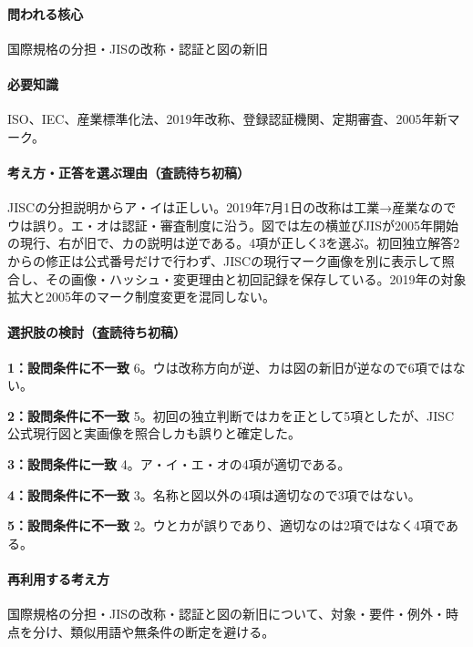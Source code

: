 \paragraph{問われる核心} 国際規格の分担・JISの改称・認証と図の新旧

\paragraph{必要知識} ISO、IEC、産業標準化法、2019年改称、登録認証機関、定期審査、2005年新マーク。

\paragraph{考え方・正答を選ぶ理由（査読待ち初稿）} JISCの分担説明からア・イは正しい。2019年7月1日の改称は工業→産業なのでウは誤り。エ・オは認証・審査制度に沿う。図では左の横並びJISが2005年開始の現行、右が旧で、カの説明は逆である。4項が正しく3を選ぶ。初回独立解答2からの修正は公式番号だけで行わず、JISCの現行マーク画像を別に表示して照合し、その画像・ハッシュ・変更理由と初回記録を保存している。2019年の対象拡大と2005年のマーク制度変更を混同しない。

\paragraph{選択肢の検討（査読待ち初稿）}\mbox{}\par

\noindent\textbf{1：設問条件に不一致} 6。ウは改称方向が逆、カは図の新旧が逆なので6項ではない。\par

\noindent\textbf{2：設問条件に不一致} 5。初回の独立判断ではカを正として5項としたが、JISC公式現行図と実画像を照合しカも誤りと確定した。\par

\noindent\textbf{3：設問条件に一致} 4。ア・イ・エ・オの4項が適切である。\par

\noindent\textbf{4：設問条件に不一致} 3。名称と図以外の4項は適切なので3項ではない。\par

\noindent\textbf{5：設問条件に不一致} 2。ウとカが誤りであり、適切なのは2項ではなく4項である。\par

\paragraph{再利用する考え方} 国際規格の分担・JISの改称・認証と図の新旧について、対象・要件・例外・時点を分け、類似用語や無条件の断定を避ける。

